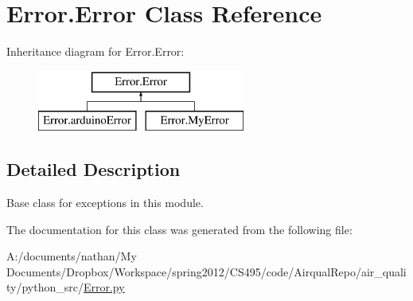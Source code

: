 \hypertarget{class_error_1_1_error}{\section{Error.\-Error Class Reference}
\label{class_error_1_1_error}
}
Inheritance diagram for Error.\-Error\-:\begin{figure}[H]
\begin{center}
\leavevmode
\includegraphics[height=2.000000cm]{class_error_1_1_error}
\end{center}
\end{figure}


\subsection{Detailed Description}
\begin{DoxyVerb}Base class for exceptions in this module.\end{DoxyVerb}
 

The documentation for this class was generated from the following file\-:\begin{DoxyCompactItemize}
\item 
A\-:/documents/nathan/\-My Documents/\-Dropbox/\-Workspace/spring2012/\-C\-S495/code/\-Airqual\-Repo/air\-\_\-quality/python\-\_\-src/\hyperlink{_error_8py}{Error.\-py}\end{DoxyCompactItemize}
